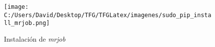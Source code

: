 \begin{figure}[!htpb]
  \centering
  \texttt{[image: C:/Users/David/Desktop/TFG/TFGLatex/imagenes/sudo\_pip\_install\_mrjob.png]}
  \caption[Instalación de \textit{mrjob}]{Instalación de \textit{mrjob}}
  \label{sudo_pip_install_mrjob}
\end{figure}

%

\clearpage